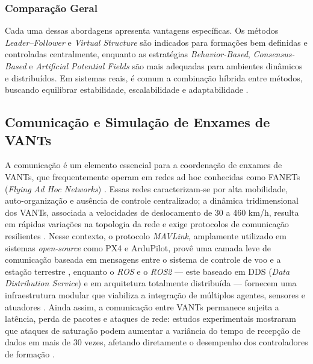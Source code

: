 \subsubsection*{Comparação Geral}

Cada uma dessas abordagens apresenta vantagens específicas. Os métodos \textit{Leader–Follower} e \textit{Virtual Structure} são indicados para formações bem definidas e controladas centralmente, enquanto as estratégias \textit{Behavior-Based}, \textit{Consensus-Based} e \textit{Artificial Potential Fields} são mais adequadas para ambientes dinâmicos e distribuídos. Em sistemas reais, é comum a combinação híbrida entre métodos, buscando equilibrar estabilidade, escalabilidade e adaptabilidade \citep{bu2024advancement, ouyang2023formation}.

\subsection{Comunicação e Simulação de Enxames de VANTs}

A comunicação é um elemento essencial para a coordenação de enxames de VANTs, que frequentemente operam em redes ad hoc conhecidas como FANETs (\textit{Flying Ad Hoc Networks}) \citep{khan2017fanet, hong2020swarm}. Essas redes caracterizam-se por alta mobilidade, auto-organização e ausência de controle centralizado; a dinâmica tridimensional dos VANTs, associada a velocidades de deslocamento de 30 a 460 km/h, resulta em rápidas variações na topologia da rede e exige protocolos de comunicação resilientes \citep{khan2017fanet}. Nesse contexto, o protocolo \textit{MAVLink}, amplamente utilizado em sistemas \textit{open-source} como PX4 e ArduPilot, provê uma camada leve de comunicação baseada em mensagens entre o sistema de controle de voo e a estação terrestre \citep{Young-Min2018}, enquanto o \textit{ROS} e o \textit{ROS2} --- este baseado em DDS (\textit{Data Distribution Service}) e em arquitetura totalmente distribuída --- fornecem uma infraestrutura modular que viabiliza a integração de múltiplos agentes, sensores e atuadores \citep{khaliq2021, ziming2023}. Ainda assim, a comunicação entre VANTs permanece sujeita a latência, perda de pacotes e ataques de rede: estudos experimentais mostraram que ataques de saturação podem aumentar a variância do tempo de recepção de dados em mais de 30 vezes, afetando diretamente o desempenho dos controladores de formação \citep{Young-Min2018}.

